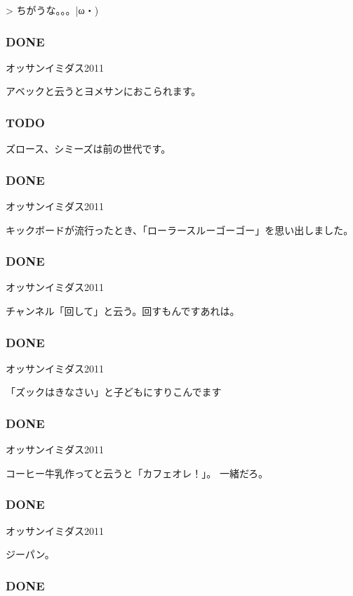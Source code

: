 \documentclass[11pt]{article}
\begin{document}
> ちがうな。。。|ω・)
\subsubsection{\textbf{DONE}}
\label{sec-125_1_3}

オッサンイミダス2011

アベックと云うとヨメサンにおこられます。
\subsubsection{\textbf{TODO}}
\label{sec-125_1_4}


ズロース、シミーズは前の世代です。
\subsubsection{\textbf{DONE}}
\label{sec-125_1_5}

オッサンイミダス2011

キックボードが流行ったとき、「ローラースルーゴーゴー」を思い出しました。
\subsubsection{\textbf{DONE}}
\label{sec-125_1_6}

オッサンイミダス2011

チャンネル「回して」と云う。回すもんですあれは。
\subsubsection{\textbf{DONE}}
\label{sec-125_1_7}

オッサンイミダス2011

「ズックはきなさい」と子どもにすりこんでます
\subsubsection{\textbf{DONE}}
\label{sec-125_1_8}

オッサンイミダス2011

コーヒー牛乳作ってと云うと「カフェオレ！」。
一緒だろ。
\subsubsection{\textbf{DONE}}
\label{sec-125_1_9}

オッサンイミダス2011

ジーパン。
\subsubsection{\textbf{DONE}}
\label{sec-125_1_10}
\end{document}

